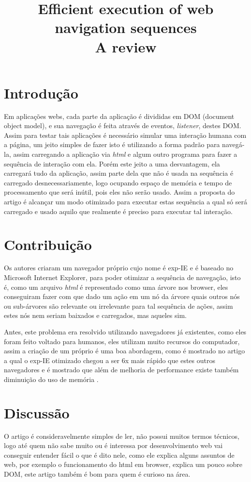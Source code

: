 \documentclass[conference]{IEEEtran}
\title{Efficient execution of web navigation sequences \cite{art:main}
  \\ A review}
\author{
  \IEEEauthorblockA{Universidade Federal de Alagoas -- Instituto de Computação
    \\ Professor: André Lage Freitas -- Matéria: Sistema Distribuídos}
  \IEEEauthorblockN{Revisado por: \textbf{Bruno da Silva Belo} (12110981)
    e \textbf{Iago Barbosa de Souza} (14210353) em 2016-08-13}
}
\begin{document}
\maketitle

\section{Introdução}
\label{sec:intro}
Em aplicações webs, cada parte da aplicação é divididas em DOM (document object
model), e sua navegação é feita através de eventos, \emph{listener}, destes DOM.
Assim para testar tais aplicações é necessário simular uma interação humana com
a página, um jeito simples de fazer isto é utilizando a forma padrão para
navegá-la, assim carregando a aplicação via \emph{html} e algum outro programa
para fazer a sequência de interação com ela. Porém este jeito a uma desvantagem,
ela carregará tudo da aplicação, assim parte dela que não é usada na sequência é
carregado desnecessariamente, logo ocupando espaço de memória e tempo de
processamento que será inútil, pois eles não serão usado. Assim a proposta do
artigo é alcançar um modo otimizado para executar estas sequência a qual só será
carregado e usado aquilo que realmente é preciso para executar tal interação.
\section{Contribuição}
\label{sec:contrib}
Os autores criaram um navegador próprio cujo nome é exp-IE e é baseado no
Microsoft Internet Explorer,  para poder otimizar a sequência de navegação, isto
é, como um arquivo \emph{html} é representado como uma árvore nos browser, eles
conseguiram fazer com que dado um ação em um nó da árvore quais outros nós ou
sub-árvores são relevante ou irrelevante para tal sequência de ações, assim
estes nós nem seriam baixados e carregados, mas aqueles sim.

Antes, este problema era resolvido utilizando navegadores já existentes, como
eles foram feito voltado para humanos, eles utilizam muito recursos do
computador, assim a criação de um próprio é uma boa abordagem, como é mostrado
no artigo a qual o exp-IE otimizado chegou a ser 6x mais rápido que estes outros
navegadores e é mostrado que além de melhoria de performance existe também
diminuição do uso de memória .
\section{Discussão}
\label{sec:discussao}
O artigo\cite{art:main} é consideravelmente simples de ler, não possui muitos
termos técnicos, logo até quem não sabe muito ou é interessa por desenvolvimento
web vai conseguir entender fácil o que é dito nele, como ele explica alguns
assuntos de web, por exemplo o funcionamento do html em browser, explica um
pouco sobre DOM, este artigo também é bom para quem é curioso na área.
\end{document}
